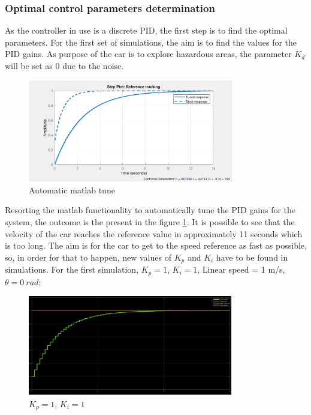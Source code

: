 \subsubsection{Optimal control parameters determination}
As the controller in use is a discrete PID, the first step is to find the optimal parameters.
For the first set of simulations, the aim is to find the values for the PID gains. As purpose of the car is to explore hazardous areas, the parameter $K_d$ will be set as 0 due to the noise. \\
\begin{figure}[!h]
\centering
\includegraphics[width=0.8\textwidth]{./img/pidtuned.png}
\caption {\label{fig:pid1-tuned}Automatic matlab tune}
\end{figure}
Resorting the matlab functionality to automatically tune the PID gains for the system, the outcome is the present in the figure \ref{fig:pid1-tuned}. It is possible to see that the velocity of the car reaches the reference value in approximately 11 seconds which is too long. The aim is for the car to get to the speed reference as fast as possible, so, in order for that to happen, new values of $K_p$ and $K_i$ have to be found in simulations.
For the first simulation, $K_p = 1$, $K_i = 1$, Linear speed = 1 m/s, $\theta = 0~\si{rad}$:
\begin{figure}[!h]
\centering
\includegraphics[width=0.8\textwidth]{./img/pid11.png}
\caption {\label{fig:pid1-p1i1}$K_p=1$, $K_i=1$}
\end{figure}
